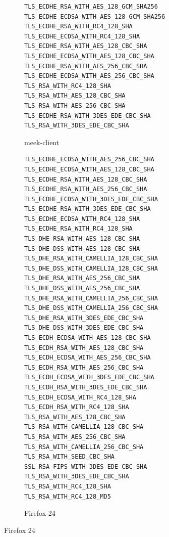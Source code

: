 \documentclass{article}
\begin{document}
\begin{figure}

\begin{subfigure}[t]{0.30\textwidth}
\begin{minipage}[t][17ex][t]{0.30\textwidth}
\tiny
\begin{verbatim}
TLS_ECDHE_RSA_WITH_AES_128_GCM_SHA256
TLS_ECDHE_ECDSA_WITH_AES_128_GCM_SHA256
TLS_ECDHE_RSA_WITH_RC4_128_SHA
TLS_ECDHE_ECDSA_WITH_RC4_128_SHA
TLS_ECDHE_RSA_WITH_AES_128_CBC_SHA
TLS_ECDHE_ECDSA_WITH_AES_128_CBC_SHA
TLS_ECDHE_RSA_WITH_AES_256_CBC_SHA
TLS_ECDHE_ECDSA_WITH_AES_256_CBC_SHA
TLS_RSA_WITH_RC4_128_SHA
TLS_RSA_WITH_AES_128_CBC_SHA
TLS_RSA_WITH_AES_256_CBC_SHA
TLS_ECDHE_RSA_WITH_3DES_EDE_CBC_SHA
TLS_RSA_WITH_3DES_EDE_CBC_SHA
\end{verbatim}
\end{minipage}
\caption{meek-client}
\label{fig:ciphersuites:meek-client}
\end{subfigure}
%
\begin{subfigure}[t]{0.30\textwidth}
\begin{minipage}[t][48ex][t]{0.30\textwidth}
\tiny
\begin{verbatim}
TLS_ECDHE_ECDSA_WITH_AES_256_CBC_SHA
TLS_ECDHE_ECDSA_WITH_AES_128_CBC_SHA
TLS_ECDHE_RSA_WITH_AES_128_CBC_SHA
TLS_ECDHE_RSA_WITH_AES_256_CBC_SHA
TLS_ECDHE_ECDSA_WITH_3DES_EDE_CBC_SHA
TLS_ECDHE_RSA_WITH_3DES_EDE_CBC_SHA
TLS_ECDHE_ECDSA_WITH_RC4_128_SHA
TLS_ECDHE_RSA_WITH_RC4_128_SHA
TLS_DHE_RSA_WITH_AES_128_CBC_SHA
TLS_DHE_DSS_WITH_AES_128_CBC_SHA
TLS_DHE_RSA_WITH_CAMELLIA_128_CBC_SHA
TLS_DHE_DSS_WITH_CAMELLIA_128_CBC_SHA
TLS_DHE_RSA_WITH_AES_256_CBC_SHA
TLS_DHE_DSS_WITH_AES_256_CBC_SHA
TLS_DHE_RSA_WITH_CAMELLIA_256_CBC_SHA
TLS_DHE_DSS_WITH_CAMELLIA_256_CBC_SHA
TLS_DHE_RSA_WITH_3DES_EDE_CBC_SHA
TLS_DHE_DSS_WITH_3DES_EDE_CBC_SHA
TLS_ECDH_ECDSA_WITH_AES_128_CBC_SHA
TLS_ECDH_RSA_WITH_AES_128_CBC_SHA
TLS_ECDH_ECDSA_WITH_AES_256_CBC_SHA
TLS_ECDH_RSA_WITH_AES_256_CBC_SHA
TLS_ECDH_ECDSA_WITH_3DES_EDE_CBC_SHA
TLS_ECDH_RSA_WITH_3DES_EDE_CBC_SHA
TLS_ECDH_ECDSA_WITH_RC4_128_SHA
TLS_ECDH_RSA_WITH_RC4_128_SHA
TLS_RSA_WITH_AES_128_CBC_SHA
TLS_RSA_WITH_CAMELLIA_128_CBC_SHA
TLS_RSA_WITH_AES_256_CBC_SHA
TLS_RSA_WITH_CAMELLIA_256_CBC_SHA
TLS_RSA_WITH_SEED_CBC_SHA
SSL_RSA_FIPS_WITH_3DES_EDE_CBC_SHA
TLS_RSA_WITH_3DES_EDE_CBC_SHA
TLS_RSA_WITH_RC4_128_SHA
TLS_RSA_WITH_RC4_128_MD5
\end{verbatim}
\end{minipage}
\caption{Firefox 24}
\label{fig:ciphersuites:firefox}
\end{subfigure}

\end{figure}
\end{document}
